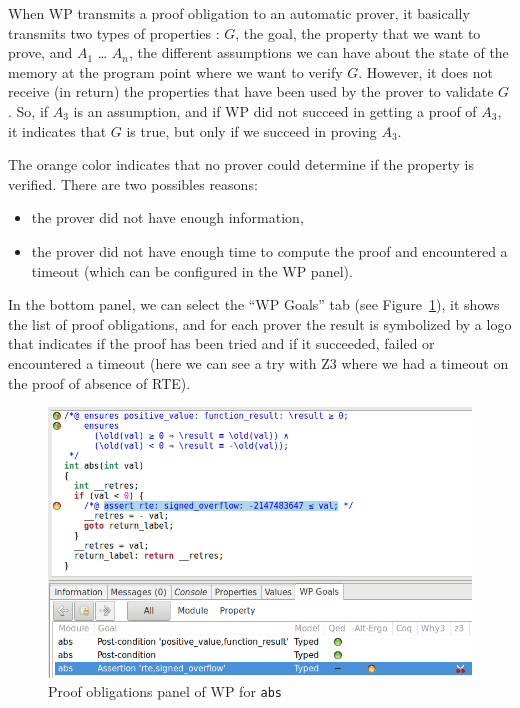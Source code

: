 \documentclass[12pt,francais,]{scrbook}
\providecommand{\tightlist}{%
  \setlength{\itemsep}{0pt}\setlength{\parskip}{0pt}}
\begin{document}
When WP transmits a proof obligation to an automatic prover, it
basically transmits two types of properties : \(G\), the goal, the
property that we want to prove, and \(A_1\) \ldots{} \(A_n\), the
different assumptions we can have about the state of the memory at the
program point where we want to verify \(G\). However, it does not
receive (in return) the properties that have been used by the prover to
validate \(G\). So, if \(A_3\) is an assumption, and if WP did not
succeed in getting a proof of \(A_3\), it indicates that \(G\) is true,
but only if we succeed in proving \(A_3\).

The orange color indicates that no prover could determine if the
property is verified. There are two possibles reasons:

\begin{itemize}
\tightlist
\item
  the prover did not have enough information,
\item
  the prover did not have enough time to compute the proof and
  encountered a timeout (which can be configured in the WP panel).
\end{itemize}

In the bottom panel, we can select the ``WP Goals'' tab
(see Figure~\ref{fig:2-1-1-abs-5}), it shows the
list of proof obligations, and for each prover the result is symbolized
by a logo that indicates if the proof has been tried and if it
succeeded, failed or encountered a timeout (here we can see a try with
Z3 where we had a timeout on the proof of absence of RTE).

\begin{figure}[htbp]
\centering
\includegraphics[scale=0.5]{2-1-1-abs-5.png}
\caption{Proof obligations panel of WP for \texttt{abs}}
\label{fig:2-1-1-abs-5}
\end{figure}
\end{document}
